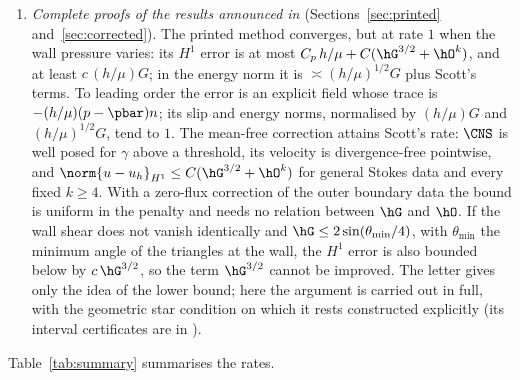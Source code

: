 \begin{enumerate}[label=(\arabic*)]
\item \emph{Complete proofs of the results announced in \cite{CavalcantePadhiLetter}} (Sections~\ref{sec:printed} and~\ref{sec:corrected}). The printed method converges, but at rate $1$ when the wall pressure varies: its $H^1$ error is at most $C_p\,h/\mu+C(\hG^{3/2}+\hO^k)$, and at least $c\,(h/\mu)G$; in the energy norm it is $\asymp(h/\mu)^{1/2}G$ plus Scott's terms. To leading order the error is an explicit field whose trace is $-(h/\mu)(p-\pbar)n$; its slip and energy norms, normalised by $(h/\mu)G$ and $(h/\mu)^{1/2}G$, tend to $1$. The mean-free correction attains Scott's rate: $\CNS$ is well posed for $\gamma$ above a threshold, its velocity is divergence-free pointwise, and $\norm{u-u_h}_{H^1}\le C(\hG^{3/2}+\hO^k)$ for general Stokes data and every fixed $k\ge4$. With a zero-flux correction of the outer boundary data the bound is uniform in the penalty and needs no relation between $\hG$ and $\hO$. If the wall shear does not vanish identically and $\hG\le2\sin(\theta_{\min}/4)$, with $\theta_{\min}$ the minimum angle of the triangles at the wall, the $H^1$ error is also bounded below by $c\,\hG^{3/2}$, so the term $\hG^{3/2}$ cannot be improved. The letter gives only the idea of the lower bound; here the argument is carried out in full, with the geometric star condition on which it rests constructed explicitly (its interval certificates are in \cite{PadhiExt}).
\end{enumerate}
Table~\ref{tab:summary} summarises the rates.

